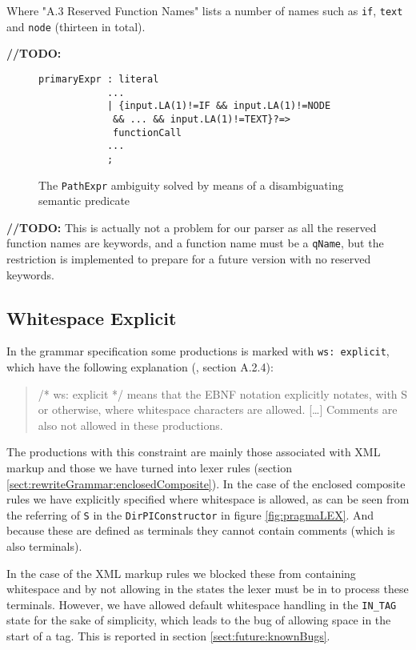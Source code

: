 Where "A.3 Reserved Function Names" lists a number of names such as \verb!if!, \verb!text! and \verb!node! (thirteen in total).

\textbf{\LARGE //TODO:}
\begin{figure}[h!]
\begin{Verbatim}
primaryExpr : literal 
            ...
            | {input.LA(1)!=IF && input.LA(1)!=NODE
             && ... && input.LA(1)!=TEXT}?=>
             functionCall 
            ...
            ;
\end{Verbatim}
\caption[The \texttt{PathExpr} ambiguity solved]{The \texttt{PathExpr} ambiguity solved by means of a disambiguating semantic predicate}
\label{fig:reservedFunction}
\end{figure}

\textbf{\LARGE //TODO:} This is actually not a problem for our parser as all the reserved function names are keywords, and a function name must be a \verb!qName!, but the restriction is implemented to prepare for a future version with no reserved keywords.

\subsection{Whitespace Explicit}
\label{sect:implementation:whitespace}
In the grammar specification some productions is marked with \verb!ws: explicit!, which have the following explanation (\cite{w3c00}, section A.2.4):
\begin{quote}
/* ws: explicit */ means that the EBNF notation explicitly notates, with S or otherwise, where whitespace characters are allowed. [\ldots] Comments are also not allowed in these productions.
\end{quote} 

The productions with this constraint are mainly those associated with XML markup and those we have turned into lexer rules (section \ref{sect:rewriteGrammar:enclosedComposite}). In the case of the enclosed composite rules we have explicitly specified where whitespace is allowed, as can be seen from the referring of \verb!S! in the \verb!DirPIConstructor! in figure \ref{fig:pragmaLEX}. And because these are defined as terminals they cannot contain comments (which is also terminals).

In the case of the XML markup rules we blocked these from containing whitespace and by not allowing in the states the lexer must be in to process these terminals. However, we have allowed default whitespace handling in the \verb!IN_TAG! state for the sake of simplicity, which leads to the bug of allowing space in the start of a tag. This is reported in section \ref{sect:future:knownBugs}.

